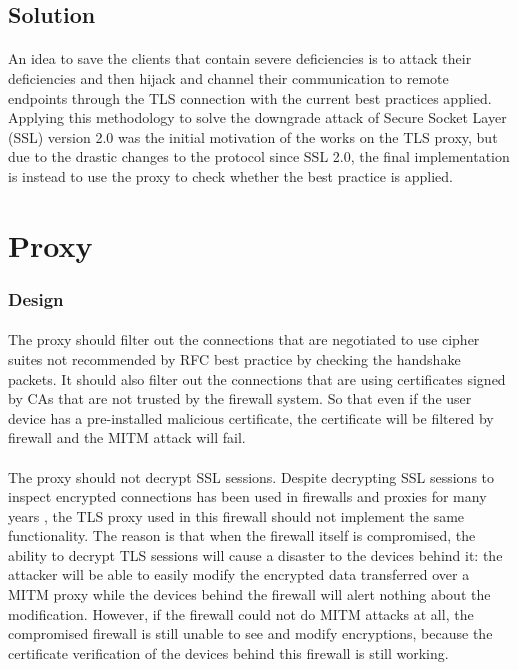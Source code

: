 \documentclass[mscthesis]{usiinfthesis}
\begin{document}
\subsection{Solution}
\paragraph{}
An idea to save the clients that contain severe deficiencies is to attack their deficiencies and then hijack and channel their communication to remote endpoints through the TLS connection with the current best practices applied. Applying this methodology to solve the downgrade attack of Secure Socket Layer (SSL) version 2.0 was the initial motivation of the works on the TLS proxy, but due to the drastic changes to the protocol since SSL 2.0, the final implementation is instead to use the proxy to check whether the best practice is applied.


\section{Proxy}
\subsubsection{Design}
\paragraph{}
The proxy should filter out the connections that are negotiated to use cipher suites not recommended by RFC best practice by checking the handshake packets. It should also filter out the connections that are using certificates signed by CAs that are not trusted by the firewall system. So that even if the user device has a pre-installed malicious certificate, the certificate will be filtered by firewall and the MITM attack will fail.
\paragraph{}
The proxy should not decrypt SSL sessions. Despite decrypting SSL sessions to inspect encrypted connections has been used in firewalls and proxies for many years \citep{fortigate:deepinspection}, the TLS proxy used in this firewall should not implement the same functionality. The reason is that when the firewall itself is compromised, the ability to decrypt TLS sessions will cause a disaster to the devices behind it: the attacker will be able to easily modify the encrypted data transferred over a MITM proxy while the devices behind the firewall will alert nothing about the modification. However, if the firewall could not do MITM attacks at all, the compromised firewall is still unable to see and modify encryptions, because the certificate verification of the devices behind this firewall is still working.
\end{document}
